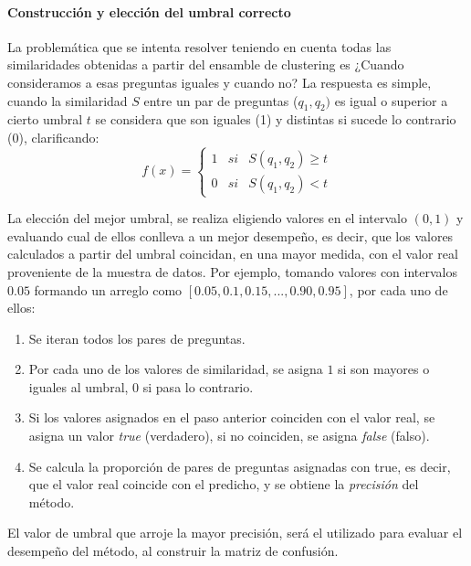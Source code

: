 \paragraph{Construcción y elección del umbral correcto}
La problemática que se intenta resolver teniendo en cuenta todas las similaridades obtenidas a partir del ensamble de clustering es ¿Cuando consideramos a esas preguntas iguales y cuando no? La respuesta es simple, cuando la similaridad \(S\) entre un par de preguntas (\(q_1,q_2)\) es igual o superior a cierto umbral \(t\) se considera que son iguales (1) y distintas si sucede lo contrario (0), clarificando:
\[f(x) = \left\{ \begin{array}{lcc} 1 & si & S(q_1, q_2)\geq t
	\\ 0 & si & S(q_1, q_2) < t
\end{array} \right.\]

La elección del mejor umbral, se realiza eligiendo valores en el intervalo \((0,1)\) y evaluando cual de ellos conlleva a un mejor desempeño, es decir, que los valores calculados a partir del umbral coincidan, en una mayor medida, con el valor real proveniente de la muestra de datos. Por ejemplo, tomando valores con intervalos \(0.05\) formando un arreglo como \([0.05, 0.1, 0.15, ..., 0.90, 0.95]\), por cada uno de ellos:
\begin{enumerate}
	\item Se iteran todos los pares de preguntas.
	\item Por cada uno de los valores de similaridad, se asigna \(1\) si son mayores o iguales al umbral, \(0\) si pasa lo contrario.
	\item Si los valores asignados en el paso anterior coinciden con el valor real, se asigna un valor \textit{true} (verdadero), si no coinciden, se asigna \textit{false} (falso).
	\item Se calcula la proporción de pares de preguntas asignadas con true, es decir, que el valor real coincide con el predicho, y se obtiene la \textit{precisión} del método.
\end{enumerate}
El valor de umbral que arroje la mayor precisión, será el utilizado para evaluar el desempeño del método, al construir la matriz de confusión.

